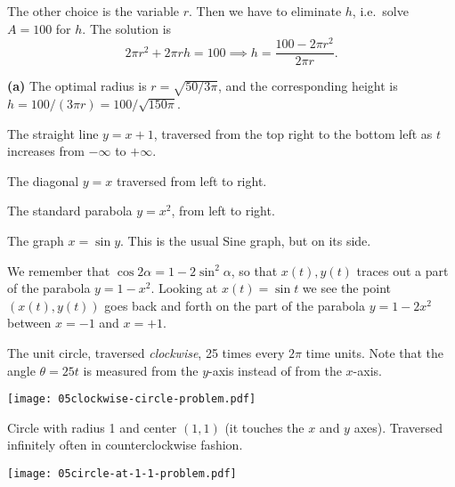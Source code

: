 The other choice is the variable $r$.  Then we have to eliminate $h$,
i.e.~solve $A=100$ for $h$.  The solution is
\[
2\pi r^2 + 2\pi rh = 100 \implies
h = \frac{100 - 2\pi r^2} {2\pi r}.
\]




\bigskip

\item[{\bfseries(V14.4c)}]
\textbf{(a)} The optimal radius is $r = \sqrt{50/3\pi}$, and the corresponding
height is $h = 100/(3\pi r) = 100/\sqrt{150\pi}$.
\bigskip

\item[{\bfseries(V16.1a)}]
The straight line $y=x+1$, traversed from the top right to the bottom left
as $t$ increases from $-\infty$ to $+\infty$.
\bigskip

\item[{\bfseries(V16.1b)}]
The diagonal $y=x$ traversed from left to right.
\bigskip

\item[{\bfseries(V16.1c)}]
The standard parabola $y=x^2$, from left to right.
\bigskip

\item[{\bfseries(V16.1d)}]
The graph $x=\sin y$.  This is the usual Sine graph, but on its side.




\centerline{ }
\bigskip

\item[{\bfseries(V16.1e)}]
We remember that $\cos2\alpha = 1-2\sin^2\alpha$, so that
$x(t), y(t)$ traces out a part of the parabola $y=1-x^2$.
Looking at $x(t) = \sin t$ we see the point $(x(t), y(t))$ goes back
and forth on the part of the parabola $y=1-2x^2$ between $x=-1$
and $x=+1$.
\bigskip

\item[{\bfseries(V16.1f)}]
The unit circle, traversed \emph{clockwise}, 25 times every $2\pi$ time units.
Note that the angle $\theta = 25t$ is measured from the $y$-axis instead of from
the $x$-axis.




\begin{center}
  \texttt{[image: 05clockwise-circle-problem.pdf]}
\end{center}
\bigskip

\item[{\bfseries(V16.1g)}]
Circle with radius 1 and center $(1,1)$ (it touches the $x$ and $y$ axes).
Traversed infinitely often in counterclockwise fashion.
\begin{center}
  \texttt{[image: 05circle-at-1-1-problem.pdf]}
\end{center}
\bigskip

